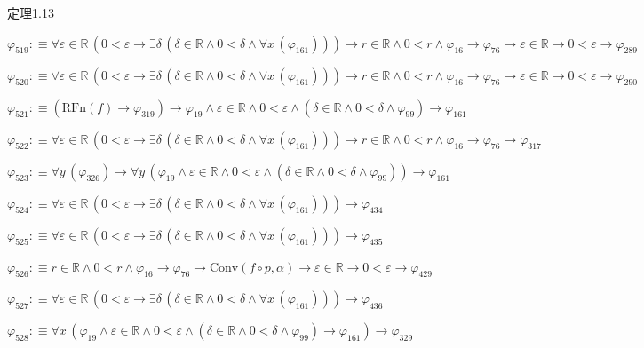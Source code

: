 \begin{fullproof}{定理1.13}
\begin{abbrevlist}
\item $\varphi_{519} :\equiv \forall \varepsilon \in \mathbb{R}\,(0 < \varepsilon \to \exists \delta\,(\delta \in \mathbb{R} \land 0 < \delta \land \forall x\,(\varphi_{161}))) \to r \in \mathbb{R} \land 0 < r \land \varphi_{16} \to \varphi_{76} \to \varepsilon \in \mathbb{R} \to 0 < \varepsilon \to \varphi_{289}$
\item $\varphi_{520} :\equiv \forall \varepsilon \in \mathbb{R}\,(0 < \varepsilon \to \exists \delta\,(\delta \in \mathbb{R} \land 0 < \delta \land \forall x\,(\varphi_{161}))) \to r \in \mathbb{R} \land 0 < r \land \varphi_{16} \to \varphi_{76} \to \varepsilon \in \mathbb{R} \to 0 < \varepsilon \to \varphi_{290}$
\item $\varphi_{521} :\equiv (\mathrm{RFn}(f) \to \varphi_{319}) \to \varphi_{19} \land \varepsilon \in \mathbb{R} \land 0 < \varepsilon \land (\delta \in \mathbb{R} \land 0 < \delta \land \varphi_{99}) \to \varphi_{161}$
\item $\varphi_{522} :\equiv \forall \varepsilon \in \mathbb{R}\,(0 < \varepsilon \to \exists \delta\,(\delta \in \mathbb{R} \land 0 < \delta \land \forall x\,(\varphi_{161}))) \to r \in \mathbb{R} \land 0 < r \land \varphi_{16} \to \varphi_{76} \to \varphi_{317}$
\item $\varphi_{523} :\equiv \forall y\,(\varphi_{326}) \to \forall y\,(\varphi_{19} \land \varepsilon \in \mathbb{R} \land 0 < \varepsilon \land (\delta \in \mathbb{R} \land 0 < \delta \land \varphi_{99})) \to \varphi_{161}$
\item $\varphi_{524} :\equiv \forall \varepsilon \in \mathbb{R}\,(0 < \varepsilon \to \exists \delta\,(\delta \in \mathbb{R} \land 0 < \delta \land \forall x\,(\varphi_{161}))) \to \varphi_{434}$
\item $\varphi_{525} :\equiv \forall \varepsilon \in \mathbb{R}\,(0 < \varepsilon \to \exists \delta\,(\delta \in \mathbb{R} \land 0 < \delta \land \forall x\,(\varphi_{161}))) \to \varphi_{435}$
\item $\varphi_{526} :\equiv r \in \mathbb{R} \land 0 < r \land \varphi_{16} \to \varphi_{76} \to \mathrm{Conv}(f \circ p,\alpha) \to \varepsilon \in \mathbb{R} \to 0 < \varepsilon \to \varphi_{429}$
\item $\varphi_{527} :\equiv \forall \varepsilon \in \mathbb{R}\,(0 < \varepsilon \to \exists \delta\,(\delta \in \mathbb{R} \land 0 < \delta \land \forall x\,(\varphi_{161}))) \to \varphi_{436}$
\item $\varphi_{528} :\equiv \forall x\,(\varphi_{19} \land \varepsilon \in \mathbb{R} \land 0 < \varepsilon \land (\delta \in \mathbb{R} \land 0 < \delta \land \varphi_{99}) \to \varphi_{161}) \to \varphi_{329}$

\end{abbrevlist}
\end{fullproof}
